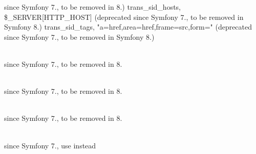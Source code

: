 \begin{DoxyRefList}
since Symfony 7., to be removed in 8.) trans\+\_\+sid\+\_\+hosts, \$\+\_\+\+SERVER\mbox{[}\textquotesingle{}HTTP\+\_\+\+HOST\textquotesingle{}\mbox{]} (deprecated since Symfony 7., to be removed in Symfony 8.) trans\+\_\+sid\+\_\+tags, "{}a=href,area=href,frame=src,form="{} (deprecated since Symfony 7., to be removed in Symfony 8.)  
\item[Class \doxylink{class_symfony_1_1_component_1_1_http_kernel_1_1_dependency_injection_1_1_add_annotated_classes_to_cache_pass}{Symfony\textbackslash{}Component\textbackslash{}Http\+Kernel\textbackslash{}Dependency\+Injection\textbackslash{}Add\+Annotated\+Classes\+To\+Cache\+Pass} ]\hfill \\
\label{deprecated__deprecated000308}%
%
since Symfony 7., to be removed in 8.  
\item[Member \doxylink{class_symfony_1_1_component_1_1_http_kernel_1_1_dependency_injection_1_1_extension_a7cb649732e313b1ab824c77113ab7f59}{Symfony\textbackslash{}Component\textbackslash{}Http\+Kernel\textbackslash{}Dependency\+Injection\textbackslash{}Extension\+::add\+Annotated\+Classes\+To\+Compile} (array \$annotated\+Classes)]\hfill \\
\label{deprecated__deprecated000310}%
%
since Symfony 7., to be removed in 8.  
\item[Member \doxylink{class_symfony_1_1_component_1_1_http_kernel_1_1_dependency_injection_1_1_extension_a21a029eff10437ea8ddc25b970ac04f0}{Symfony\textbackslash{}Component\textbackslash{}Http\+Kernel\textbackslash{}Dependency\+Injection\textbackslash{}Extension\+::get\+Annotated\+Classes\+To\+Compile} ()]\hfill \\
\label{deprecated__deprecated000309}%
%
since Symfony 7., to be removed in 8.  
\item[Class \doxylink{class_symfony_1_1_component_1_1_mailer_1_1_test_1_1_transport_factory_test_case}{Symfony\textbackslash{}Component\textbackslash{}Mailer\textbackslash{}Test\textbackslash{}Transport\+Factory\+Test\+Case} ]\hfill \\
\label{deprecated__deprecated000311}%
%
since Symfony 7., use  instead  
\item[Member \doxylink{class_symfony_1_1_component_1_1_routing_1_1_loader_1_1_attribute_class_loader_a3a45216a4895be4ab31f4ff05c907f9b}{Symfony\textbackslash{}Component\textbackslash{}Routing\textbackslash{}Loader\textbackslash{}Attribute\+Class\+Loader\+::\$route\+Annotation\+Class} ]\hfill \\

\end{DoxyRefList}
